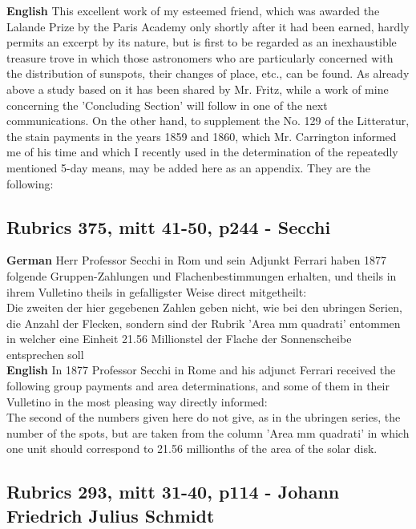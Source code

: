 \documentclass[12pt]{article}
\begin{document}
\textbf{English}
This excellent work of my esteemed friend, which was awarded the Lalande Prize by the Paris Academy only shortly after it had been earned, hardly permits an excerpt by its nature, but is first to be regarded as an inexhaustible treasure trove in which those astronomers who are particularly concerned with the distribution of sunspots, their changes of place, etc., can be found. As already above a study based on it has been shared by Mr. Fritz, while a work of mine concerning the 'Concluding Section' will follow in one of the next communications. On the other hand, to supplement the No. 129 of the Litteratur, the stain payments in the years 1859 and 1860, which Mr. Carrington informed me of his time and which I recently used in the determination of the repeatedly mentioned 5-day means, may be added here as an appendix. They are the following:

\subsection{Rubrics 375, mitt 41-50, p244 - Secchi}\label{rubrics 375}

\textbf{German}
Herr Professor Secchi in Rom und sein Adjunkt Ferrari haben 1877 folgende Gruppen-Zahlungen und Flachenbestimmungen erhalten, und theils in ihrem Vulletino theils in gefalligster Weise direct mitgetheilt:\\

Die zweiten der hier gegebenen Zahlen geben nicht, wie bei den ubringen Serien, die Anzahl der Flecken, sondern sind der Rubrik 'Area mm quadrati' entommen in welcher eine Einheit 21.56 Millionstel der Flache der Sonnenscheibe entsprechen soll\\

\textbf{English}
In 1877 Professor Secchi in Rome and his adjunct Ferrari received the following group payments and area determinations, and some of them in their Vulletino in the most pleasing way directly informed:\\

The second of the numbers given here do not give, as in the ubringen series, the number of the spots, but are taken from the column 'Area mm quadrati' in which one unit should correspond to 21.56 millionths of the area of the solar disk.\\

\subsection{Rubrics 293, mitt 31-40, p114 - Johann Friedrich Julius Schmidt}\label{rubrics 293}
\end{document}
